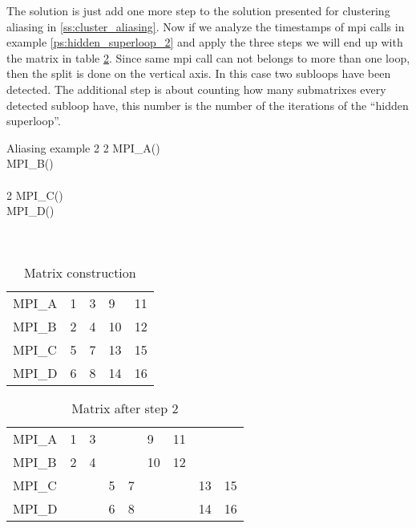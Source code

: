 The solution is just add one more step to the solution presented for clustering
aliasing in \ref{ss:cluster_aliasing}. Now if we analyze the timestamps of mpi
calls in example \ref{ps:hidden_superloop_2} and apply the three steps we will
end up with the matrix in table \ref{tb:matrix_2}. Since same mpi call can not 
belongs to more than one loop, then the split is done on the vertical axis. In 
this case two subloops have been detected. The additional step is about
counting how many submatrixes every detected subloop have, this number is the
number of the iterations of the ``hidden superloop''.

\begin{pseudocode}{Aliasing example}{ }
    \label{ps:hidden_superloop_2}
      2 \DO
    \BEGIN
          2 \DO
        \BEGIN
            MPI\_A() \\
            MPI\_B() \\
        \END \\
          2 \DO
        \BEGIN
            MPI\_C() \\
            MPI\_D() \\
        \END\\
    \END \\
\end{pseudocode}

\begin{table}[]
\centering
\caption{Matrix construction}
\label{tb:matrix_1}
\begin{tabular}{lllll}
MPI\_A & 1 & 3 & 9  & 11 \\
MPI\_B & 2 & 4 & 10 & 12 \\
MPI\_C & 5 & 7 & 13 & 15 \\
MPI\_D & 6 & 8 & 14 & 16
\end{tabular}
\end{table}

\begin{table}[]
\centering
\caption{Matrix after step 2}
\label{tb:matrix_2}
\begin{tabular}{lllllllll}
MPI\_A & 1 & 3 &   &   & 9  & 11 &    &    \\
MPI\_B & 2 & 4 &   &   & 10 & 12 &    &    \\
MPI\_C &   &   & 5 & 7 &    &    & 13 & 15 \\
MPI\_D &   &   & 6 & 8 &    &    & 14 & 16
\end{tabular}
\end{table}
